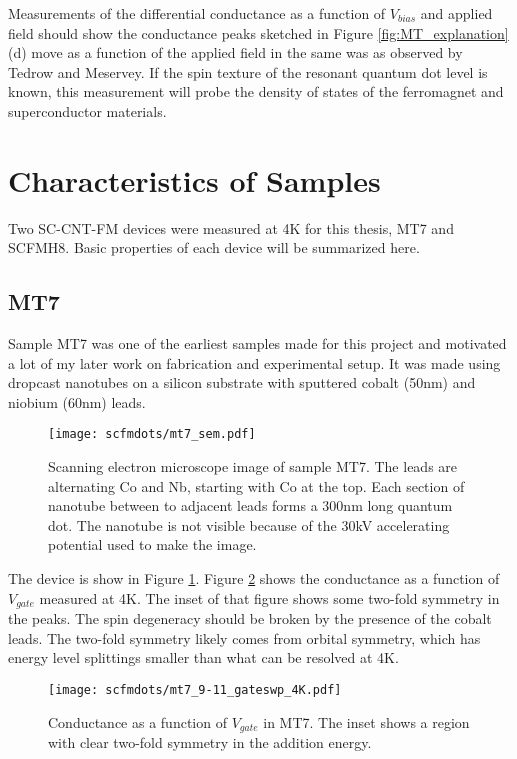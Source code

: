 Measurements of the differential conductance as a function of $V_{bias}$ and applied field should show the conductance peaks sketched in Figure \ref{fig:MT_explanation}(d) move as a function of the applied field in the same was as observed by Tedrow and Meservey. If the spin texture of the resonant quantum dot level is known, this measurement will probe the density of states of the ferromagnet and superconductor materials.

\section{Characteristics of Samples}

Two SC-CNT-FM devices were measured at 4K for this thesis, MT7 and SCFMH8. Basic properties of each device will be summarized here.

\subsection*{MT7}

Sample MT7 was one of the earliest samples made for this project and motivated a lot of my later work on fabrication and experimental setup. It was made using dropcast nanotubes on a silicon substrate with sputtered cobalt (50nm) and niobium (60nm) leads. 

\begin{figure}
    \centering
    \texttt{[image: scfmdots/mt7\_sem.pdf]}
    \caption{Scanning electron microscope image of sample MT7. The leads are alternating Co and Nb, starting with Co at the top. Each section of nanotube between to adjacent leads forms a 300nm long quantum dot. The nanotube is not visible because of the 30kV accelerating potential used to make the image.}
    \label{fig:mt7}
\end{figure}

The device is show in Figure \ref{fig:mt7}. Figure \ref{fig:mt7_gate} shows the conductance as a function of $V_{gate}$ measured at 4K. The inset of that figure shows some two-fold symmetry in the peaks. The spin degeneracy should be broken by the presence of the cobalt leads. The two-fold symmetry likely comes from orbital symmetry, which has energy level splittings smaller than what can be resolved at 4K.

\begin{figure}
    \centering
    \texttt{[image: scfmdots/mt7\_9-11\_gateswp\_4K.pdf]}
    \caption{Conductance as a function of $V_{gate}$ in MT7. The inset shows a region with clear two-fold symmetry in the addition energy.}
    \label{fig:mt7_gate}
\end{figure}

